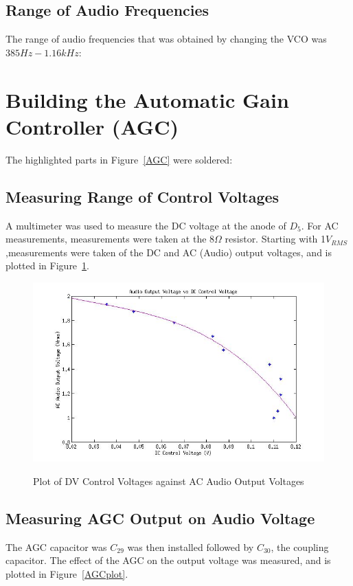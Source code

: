 \documentclass{article}
\begin{document}
  \subsection{Range
    of
    Audio
  Frequencies}
  The
  range
  of
  audio
  frequencies
  that
  was
  obtained
  by
  changing
  the
  VCO
  was
  $\boxed{385Hz-1.16kHz}$:

  \section{Building
    the
    Automatic
    Gain
    Controller
  (AGC)}
  The
  highlighted
  parts
  in
  Figure~\ref{AGC}
  were
  soldered:
  \subsection{Measuring
    Range
    of
    Control
  Voltages}
  A
  multimeter
  was
  used
  to
  measure
  the
  DC
  voltage
  at
  the
  anode
  of
  $D_5$.
  For
  AC
  measurements,
  measurements
  were
  taken
  at
  the
  8$\Omega$
  resistor.
  Starting
  with
  1$V_{RMS}$,measurements
  were
  taken
  of
  the
  DC
  and
  AC
  (Audio)
  output
  voltages,
  and
  is
  plotted
  in
  Figure~\ref{controlvolts}.

  \begin{figure}[ht!]
    \centering
    \includegraphics[scale=0.5]{controlvolts.jpg}
    \label{controlvolts}
    \caption{Plot
      of
      DV
      Control
      Voltages
      against
      AC
      Audio
      Output
    Voltages}
  \end{figure}

  \subsection{Measuring
    AGC
    Output
    on
    Audio
  Voltage}
  The
  AGC
  capacitor
  was
  $C_{29}$
  was
  then
  installed
  followed
  by
  $C_{30}$,
  the
  coupling
  capacitor.
  The
  effect
  of
  the
  AGC
  on
  the
  output
  voltage
  was
  measured,
  and
  is
  plotted
  in
  Figure~\ref{AGCplot}.
\end{document}
